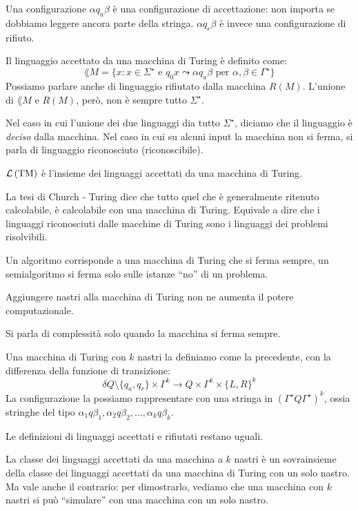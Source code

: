 Una configurazione $\alpha q_a \beta$ \`e una configurazione di accettazione: non importa se dobbiamo leggere ancora parte della stringa.
$\alpha q_r \beta$ \`e invece una configurazione di rifiuto.

Il linguaggio accettato da una macchina di Turing \`e definito come:
\[
\lang{M} = \{ x : x \in \Sigma^{\star} \text{ e } q_0 x \leadsto \alpha q_a \beta \text{ per } \alpha, \beta \in \Gamma^{\star} \}
\]
Possiamo parlare anche di linguaggio rifiutato dalla macchina $R(M)$.
L'unione di $\lang{M}$ e $R(M)$, per\`o, non \`e sempre tutto $\Sigma^{\star}$.

Nel caso in cui l'unione dei due linguaggi dia tutto $\Sigma^{\star}$, diciamo che il linguaggio \`e \emph{deciso} dalla macchina.
Nel caso in cui su alcuni input la macchina non si ferma, si parla di linguaggio riconosciuto (riconoscibile).

$\mathcal{L}\left( {\text{TM}} \right)$ \`e l'insieme dei linguaggi accettati da una macchina di Turing.

La tesi di Church - Turing dice che tutto quel che \`e generalmente ritenuto calcolabile, \`e calcolabile con una macchina di Turing.
Equivale a dire che i linguaggi riconosciuti dalle macchine di Turing sono i linguaggi dei problemi risolvibili.

Un algoritmo corrisponde a una macchina di Turing che si ferma sempre, un semialgoritmo si ferma solo sulle istanze ``no'' di un problema.

Aggiungere nastri alla macchina di Turing non ne aumenta il potere computazionale.

Si parla di complessit\`a solo quando la macchina si ferma sempre.

Una macchina di Turing con $k$ nastri la definiamo come la precedente, con la differenza della funzione di transizione:
\[
\delta Q \setminus \{q_a, q_r\} \times \Gamma^k \to Q \times \Gamma^k \times \{ L, R \}^{k}
\]
La configurazione la possiamo rappresentare con una stringa in $(\Gamma^{\star}Q\Gamma^{\star})^{k}$, ossia stringhe del tipo $\alpha_1 q \beta_1, \alpha_2 q \beta_2, \dots, \alpha_k q \beta_k$.

Le definizioni di linguaggi accettati e rifiutati restano uguali.

La classe dei linguaggi accettati da una macchina a $k$ nastri \`e un sovrainsieme della classe dei linguaggi accettati da una macchina di Turing con un solo nastro.
Ma vale anche il contrario: per dimostrarlo, vediamo che una macchina con $k$ nastri si pu\`o ``simulare'' con una macchina con un solo nastro.

